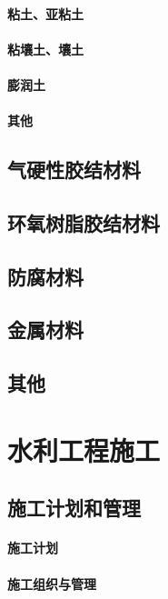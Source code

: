 \documentclass[UTF8]{../../ApplicationUniverse}
\begin{document}
        \subsubsection{粘土、亚粘土}
        \subsubsection{粘壤土、壤土}
        \subsubsection{膨润土}
        \subsubsection{其他}
\section{气硬性胶结材料}
\section{环氧树脂胶结材料}
\section{防腐材料}
\section{金属材料}
\section{其他}










\chapter{水利工程施工}
\section{施工计划和管理}
    \subsubsection{施工计划}
    \subsubsection{施工组织与管理}
\end{document}
